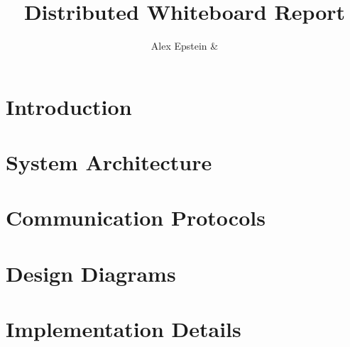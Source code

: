 \documentclass[12pt,a4paper]{report}
\title{Distributed Whiteboard Report}
\author{Alex Epstein \& }
\begin{document}
\maketitle


\section{Introduction}

\section{System Architecture}

\section{Communication Protocols}

\section{Design Diagrams}

\section{Implementation Details}
\end{document}
